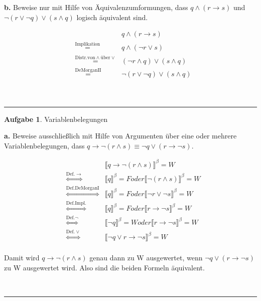 \documentclass[10pt,leqno ]{article}
\newcommand\customeq[1]{\overset{\mathrm{#1}}{=}}
\newcommand\customarroweq[1]{\overset{\mathrm{#1}}{\Leftrightarrow}}
\theoremstyle{definition}
\newtheorem{problem}[theorem]{Aufgabe}
\newenvironment{solution}[1][L]{\begin{doublespace}\textbf{#1.}\quad }{\ \rule{0.5em}{0.5em}\end{doublespace}}
\begin{document}
\begin{solution}[b]
Beweise nur mit Hilfe von Äquivalenzumformungen, dass \( q \land (r \rightarrow s) \) und \( \lnot(r \lor \lnot q) \lor (s \land q) \) logisch äquivalent sind.    

\begin{equation*}
    \begin{aligned}
    & & q \land (r \rightarrow s) \\
    & \customeq{Implikation} & q \land (\lnot r \lor s)  \\
    & \customeq{Distr. von \land \textrm{über} \lor} & (\lnot r \land q) \lor (s \land q) \\
    & \customeq{De Morgan II} & \lnot(r \lor \lnot q) \lor (s \land q) \\
    \end{aligned}
\end{equation*}

\end{solution}


\begin{problem}
    Variablenbelegungen
\end{problem}

\begin{solution}[a]
Beweise ausschließlich mit Hilfe von Argumenten über eine oder mehrere Variablenbelegungen, dass \( q \rightarrow \lnot (r \land s) \equiv \lnot q \lor (r \rightarrow \lnot s) \).

\begin{equation*}
    \begin{aligned}
    & & \llbracket q \rightarrow \lnot (r \land s) \rrbracket ^ \beta = W \\
    & \customarroweq{Def. \rightarrow} & \llbracket q \rrbracket ^ \beta = F oder \llbracket \lnot (r \land s) \rrbracket ^ \beta = W  \\
    & \customarroweq{Def. De Morgan I} & \llbracket q \rrbracket ^ \beta = F oder \llbracket \lnot r \lor \lnot s \rrbracket ^ \beta = W  \\
    & \customarroweq{Def. Impl.} & \llbracket q \rrbracket ^ \beta = F oder \llbracket r \rightarrow \lnot s \rrbracket ^ \beta = W  \\
    & \customarroweq{Def. \lnot} & \llbracket \lnot q \rrbracket ^ \beta = W oder \llbracket r \rightarrow \lnot s \rrbracket ^ \beta = W  \\
    & \customarroweq{Def. \lor} & \llbracket \lnot q \lor r \rightarrow \lnot s \rrbracket ^ \beta = W  \\
    \end{aligned}
\end{equation*}

Damit wird \( q \rightarrow \lnot (r \land s) \) genau dann zu W ausgewertet, wenn \( \lnot q \lor (r \rightarrow \lnot s) \) zu W ausgewertet wird.
Also sind die beiden Formeln äquivalent.

\end{solution}
    
\end{document}
